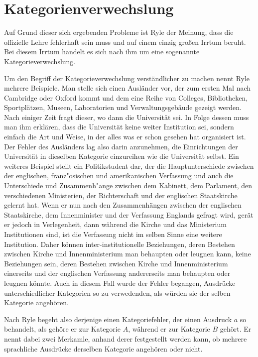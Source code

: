 \documentclass[a4paper]{article}
\begin{document}
\section{Kategorienverwechslung}
Auf Grund dieser sich ergebenden Probleme ist Ryle der Meinung, dass die offizielle Lehre fehlerhaft sein muss und auf einem einzig großen Irrtum beruht. Bei diesem Irrtum handelt es sich nach ihm um eine sogenannte Kategorieverwechslung.

Um den Begriff der Kategorieverwechslung verständlicher zu machen nennt Ryle mehrere Beispiele. Man stelle sich einen Ausländer vor, der zum ersten Mal nach Cambridge oder Oxford kommt und dem eine Reihe von Colleges, Bibliotheken, Sportplätzen, Museen, Laboratorien und Verwaltungsgebäude gezeigt werden. Nach einiger Zeit fragt dieser, wo dann die Universität sei. In Folge dessen muss man ihm erklären, dass die Universität keine weiter Institution sei, sondern einfach die Art und Weise, in der alles was er schon gesehen hat organisiert ist. Der Fehler des Ausländers lag also darin anzunehmen, die Einrichtungen der Universität in dieselben Kategorie einzureihen wie die Universität selbst. Ein weiteres Beispiel stellt ein Politikstudent dar, der die Hauptunterschiede zwischen der englischen, franz"osischen und amerikanischen Verfassung und auch die Unterschiede und Zusammenh"ange zwischen dem Kabinett, dem Parlament, den verschiedenen Ministerien, der Richterschaft und der englischen Staatskirche gelernt hat. Wenn er nun nach den Zusammenhängen zwischen der englischen Staatskirche, dem Innenminister und der Verfassung Englands gefragt wird, gerät er jedoch in Verlegenheit, dann während die Kirche und das Ministerium Institutionen sind, ist die Verfassung nicht im selben Sinne eine weitere Institution. Daher können inter-institutionelle Beziehungen, deren Bestehen zwischen Kirche und Innenministerium man behaupten oder leugnen kann, keine Beziehungen sein, deren Bestehen zwischen Kirche und Innenministerium einerseits und der englischen Verfassung andererseits man behaupten oder leugnen könnte. Auch in diesem Fall wurde der Fehler begangen, Ausdrücke unterschiedlicher Kategorien so zu verwedenden, als würden sie der selben Kategorie angehören.


Nach Ryle begeht also derjenige einen Kategoriefehler, der einen Ausdruck \(a\) so behandelt, als gehöre er zur Kategorie \(A\), während er zur Kategorie \(B\) gehört. Er nennt dabei zwei Merkamle, anhand derer festgestellt werden kann, ob mehrere sprachliche Ausdrücke derselben Kategorie angehören oder nicht.
\end{document}
